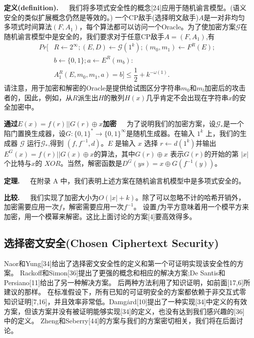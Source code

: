 \documentclass[]{article}
\begin{document}
    
    \textbf{定义(definition).}\ \ \ 
    我们将多项式安全性的概念[24]应用于随机谕言模型。(语义安全的类似扩展概念仍然是等效的。)
    一个CP敌手(选择明文敌手)$A$是一对非均匀多项式时间算法$(F,A_1)$，每个算法都可以访问一个Oracle。为了使加密方案$\mathcal{G}$在随机谕言模型中是安全的，我们要求对于任意CP敌手$A=(F,A_1)$,有
    \begin{align}\nonumber
    	Pr[& R\leftarrow 2^\infty;(E,D)\leftarrow \mathcal{G}(1^k);(m_0,m_1)\leftarrow F^R(E);\\
    	   & b\leftarrow \{0,1\};a\leftarrow E^R(m_b):\nonumber \\
    	   & A_1^R(E,m_0,m_1,a)=b]\leq \dfrac{1}{2} + k^{-\omega(1)}.\nonumber
    \end{align}
    请注意，用于加密和解密的Oracle是提供给试图区分字符串$m_0$和$m_l$加密后的攻击者的，因此，例如，从$R$派生出$H$的散列$H(x)$几乎肯定不会出现在字符串$x$的安全加密中。
    
    
    \textbf{通过$E(x)=f(r)||G(r)\oplus x$加密}\ \ \ 
    为了说明我们的加密方案，设$\mathcal{G}_*$是一个陷门置换生成器，设$G:\{0,1\}^*\rightarrow\{0,1\}^\infty$是随机生成器。在输入 $1^k$ 上，我们的生成器 $\mathcal{G}$ 运行$\mathcal{G}_*$,得到 $(f,f^{-1},d)$。$E$ 是输入 $x$ 选择 $r\leftarrow d(1^k)$并输出 $E^G(x) = f(r)||G(x)\oplus x $的算法，其中$ G(r)\oplus x$ 表示$G(r)$的开始的第 $|x|$个比特与$x$的 $XOR$。当然，解密函数是$D^G(ys)=x\oplus G(f^{-1}(y))$。
    
    
    \textbf{定理.}\ \ \ 
    在附录 A 中，我们表明上述方案在随机谕言机模型中是多项式安全的。
    
    \textbf{比较.}\ \ \ 
    我们实现了加密大小为$O(|x| + k)$。除了可以忽略不计的哈希开销外，加密需要应用一次$f$，解密需要应用一次$f^{-1}$。
    设置$f$为平方意味着用一个模平方来加密，用一个模幂来解密。这比上面讨论的方案[4]要高效得多。
    
    
    \subsection{选择密文安全(Chosen Ciphertext Security)}
    Naor和Yung[34]给出了选择密文安全性的定义和第一个可证明实现该安全性的方案。
    Rackoff和Simon[36]提出了更强的概念和相应的解决方案;De Santis和Persiano[11]给出了另一种解决方案。
    后两种方法利用了知识证明，如前面[17,6]所建议的那样。
    在标准假设下，所有已知的可证明安全的方案都依赖于非交互式零知识证明[7,16]，并且效率非常低。Damg\.{a}rd[10]提出了一种实现[34]中定义的有效方案，但该方案并没有被证明能够实现[34]的定义，也没有达到我们感兴趣的[36]中的定义。
    Zheng和Seberry[44]的方案与我们的方案密切相关，我们将在后面讨论。
    
\end{document}
